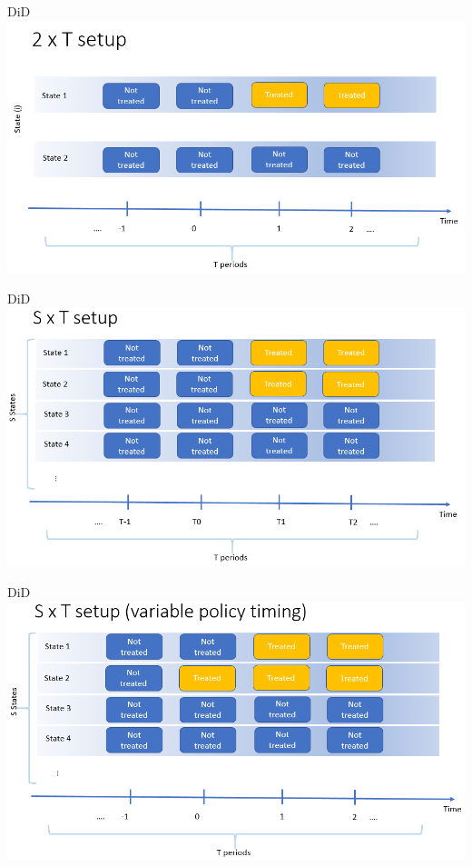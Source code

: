 \documentclass[
  ignorenonframetext,
]{beamer}
\begin{document}
\begin{frame}{DiD}
\label{did-2}
\includegraphics{2xTslide1.PNG}
\end{frame}

\begin{frame}{DiD}
\label{did-3}
\includegraphics{2xTslide2.PNG}
\end{frame}

\begin{frame}{DiD}
\label{did-4}
\includegraphics{2xTslide3.PNG}
\end{frame}
\end{document}
